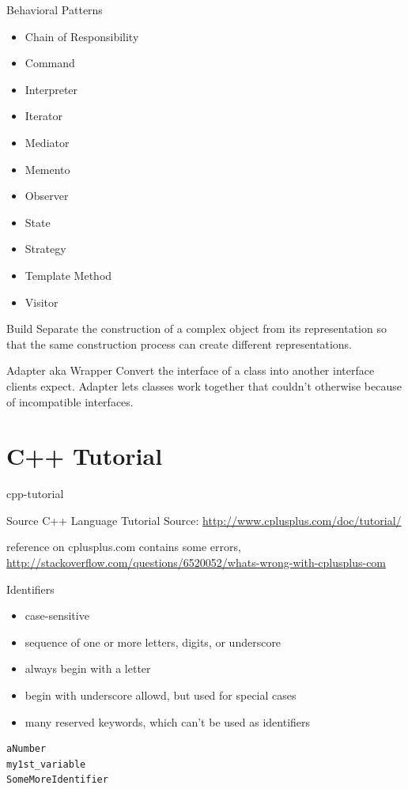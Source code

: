 \documentclass{beamer}
\begin{document}
\begin{frame}{Behavioral Patterns}
\begin{itemize}
  \item Chain of Responsibility
  \item Command
  \item Interpreter
  \item Iterator
  \item Mediator
  \item Memento
  \item Observer
  \item State
  \item Strategy
  \item Template Method
  \item Visitor
\end{itemize}
\end{frame}

\begin{frame}{Build}
Separate the construction of a complex object from its representation so that
the same construction process can create different representations.
\end{frame}

\begin{frame}{Adapter aka Wrapper}
Convert the interface of a class into another interface clients expect. Adapter
lets classes work together that couldn't otherwise because of incompatible
interfaces.
\end{frame}

\part{C++ Tutorial}{cpp-tutorial}

\begin{frame}{Source}
C++ Language Tutorial
Source: \url{http://www.cplusplus.com/doc/tutorial/}
\begin{block}

reference on cplusplus.com contains some errors,
\url{http://stackoverflow.com/questions/6520052/whats-wrong-with-cplusplus-com}
\end{block}
\end{frame}


\begin{frame}[fragile]{Identifiers}
\begin{itemize}
  \item case-sensitive
  \item sequence of one or more letters, digits, or underscore
  \item always begin with a letter
  \item begin with underscore allowd, but used for special cases
  \item many reserved keywords, which can't be used as identifiers 
\end{itemize}
\begin{lstlisting}[caption=Identifiers Examples]
aNumber
my1st_variable
SomeMoreIdentifier
\end{lstlisting}
\end{frame}
\end{document}
